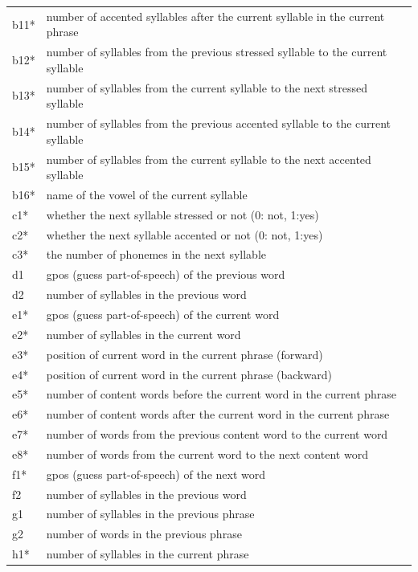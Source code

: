 \begin{longtable}[!htpb]{p{} p{}}
b11* & number of accented syllables after the current syllable in the current phrase\\
b12* & number of syllables from the previous stressed syllable to the current syllable\\
b13* & number of syllables from the current syllable to the next stressed syllable\\
b14* & number of syllables from the previous accented syllable to the current syllable\\
b15* & number of syllables from the current syllable to the next accented syllable\\
b16* & name of the vowel of the current syllable\\
\midrule
c1* & whether the next syllable stressed or not (0: not, 1:yes) \\
c2* & whether the next syllable accented or not (0: not, 1:yes) \\
c3* & the number of phonemes in the next syllable \\
\midrule
d1 & gpos (guess part-of-speech) of the previous word \\
d2 & number of syllables in the previous word \\
\midrule
e1* & gpos (guess part-of-speech) of the current word \\
e2* & number of syllables in the current word \\
e3* & position of current word in the current phrase (forward) \\
e4* & position of current word in the current phrase (backward) \\
e5* & number of content words before the current word in the current phrase \\
e6* & number of content words after the current word in the current phrase \\
e7* & number of words from the previous content word to the current word \\
e8* & number of words from the current word to the next content word \\
\midrule
f1* & gpos (guess part-of-speech) of the next word \\
f2 & number of syllables in the previous word \\
\midrule
g1 & number of syllables in the previous phrase \\
g2 & number of words in the previous phrase \\
\midrule
h1* & number of syllables in the current phrase \\

\end{longtable}
